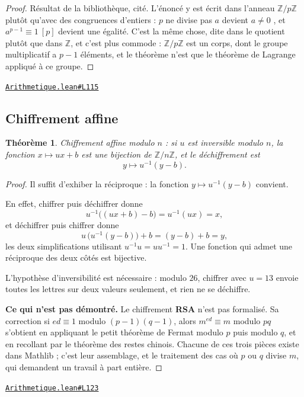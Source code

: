 \documentclass[11pt,a4paper]{article}
\theoremstyle{definition}
\theoremstyle{plain}
\newtheorem{theoreme}{Théorème}
\newcommand{\source}[2]{\par\smallskip\noindent\hfill{\footnotesize\href{#1}{\texttt{#2}}}\par\smallskip}
\begin{document}
\begin{proof}
Résultat de la bibliothèque, cité. L'énoncé y est écrit dans l'anneau
$\mathbb{Z}/p\mathbb{Z}$ plutôt qu'avec des congruences d'entiers : \og{} $p$ ne divise
pas $a$ \fg{} devient \og{} $a \ne 0$ \fg{}, et \og{} $a^{p-1} \equiv 1 \ [p]$ \fg{}
devient une égalité. C'est la même chose, dite dans le quotient plutôt que dans
$\mathbb{Z}$, et c'est plus commode : $\mathbb{Z}/p\mathbb{Z}$ est un corps, dont le groupe
multiplicatif a $p - 1$ éléments, et le théorème n'est que le théorème de Lagrange
appliqué à ce groupe.
\end{proof}
\source{https://github.com/Commutator-IO/learn-lean/blob/main/cours/02-lycee/10-specialite-mathematiques-terminale-s/Arithmetique.lean\#L115}{Arithmetique.lean\#L115}

\subsection{Chiffrement affine}

\begin{theoreme}
Chiffrement affine modulo $n$ : si $u$ est inversible modulo $n$, la fonction
$x \mapsto ux + b$ est une bijection de $\mathbb{Z}/n\mathbb{Z}$, et le déchiffrement est
\[ y \mapsto u^{-1}(y - b) . \]
\end{theoreme}

\begin{proof}
Il suffit d'exhiber la réciproque : la fonction $y \mapsto u^{-1}(y - b)$ convient.

En effet, chiffrer puis déchiffrer donne
\[ u^{-1}\bigl((ux + b) - b\bigr) = u^{-1}(ux) = x , \]
et déchiffrer puis chiffrer donne
\[ u\,\bigl(u^{-1}(y - b)\bigr) + b = (y - b) + b = y , \]
les deux simplifications utilisant $u^{-1}u = uu^{-1} = 1$. Une fonction qui admet une
réciproque des deux côtés est bijective.

\medskip\noindent
L'hypothèse d'inversibilité est nécessaire : modulo $26$, chiffrer avec $u = 13$ envoie
toutes les lettres sur deux valeurs seulement, et rien ne se déchiffre.

\medskip\noindent
\textbf{Ce qui n'est pas démontré.} Le chiffrement \textbf{RSA} n'est pas formalisé. Sa
correction \textemdash{} si $ed \equiv 1$ modulo $(p-1)(q-1)$, alors $m^{ed} \equiv m$
modulo $pq$ \textemdash{} s'obtient en appliquant le petit théorème de Fermat modulo $p$
puis modulo $q$, et en recollant par le théorème des restes chinois. Chacune de ces trois
pièces existe dans Mathlib ; c'est leur assemblage, et le traitement des cas où $p$ ou $q$
divise $m$, qui demandent un travail à part entière.
\end{proof}
\source{https://github.com/Commutator-IO/learn-lean/blob/main/cours/02-lycee/10-specialite-mathematiques-terminale-s/Arithmetique.lean\#L123}{Arithmetique.lean\#L123}
\end{document}
